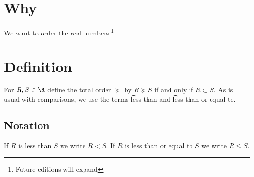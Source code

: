 
\section*{Why}

We want to order the real numbers.\footnote{Future editions will expand}

\section*{Definition}

For $R, S \in \R $ define the total order $\succeq$ by $R \succeq S$ if and only if $R \subset S$.
As is usual with comparisons, we use the terms \t{less than} and \t{less than or equal to}.


\subsection*{Notation}

If $R$ is less than $S$ we write $R < S$.
If $R$ is less than or equal to $S$ we write $R \leq S$.

\blankpage